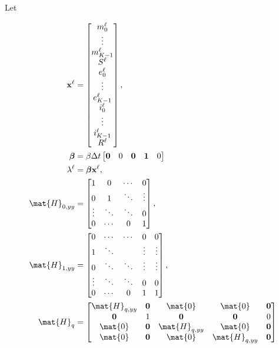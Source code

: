 \documentclass{jpmarticle}
\renewcommand{\vec}[1]{\boldsymbol{\mathrm{#1}}}
\let\subequationsorig\subequations%
\let\endsubequationsorig\endsubequations%
\renewenvironment{subequations}{
  \subequationsorig
  \renewcommand{\theequation}{\theparentequation.\arabic{equation}}
}{
  \endsubequationsorig
}
\begin{document}
Let
\begin{subequations}
  \begin{align}
    \vec{x}^{\ell} &=
    \begin{bmatrix}
      m_0^{\ell} \\ \vdots \\ m_{K - 1}^{\ell} \\
      S^{\ell} \\
      e_0^{\ell} \\ \vdots \\ e_{K - 1}^{\ell} \\
      i_0^{\ell} \\ \vdots \\ i_{K - 1}^{\ell} \\
      R^{\ell}
    \end{bmatrix},
    \\
    \vec{\beta} &=
    \beta \Delta t
    \begin{bmatrix}
      \vec{0} & 0 & \vec{0} & \vec{1} & 0
    \end{bmatrix}
    \\
    \lambda^{\ell} &=
    \vec{\beta} \vec{x}^{\ell},
    \\
    \mat{H}_{0, yy} &=
    \begin{bmatrix}
      1 & 0 & \cdots & 0 \\
      0 & 1 & \ddots & \vdots \\
      \vdots & \ddots & \ddots & 0 \\
      0 & \cdots & 0 & 1
    \end{bmatrix},
    \\
    \mat{H}_{1, yy} &=
    \begin{bmatrix}
      0 & \cdots & \cdots & 0 & 0 \\
      1 & \ddots & & \vdots & \vdots \\
      0 & \ddots & \ddots & \vdots & \vdots \\
      \vdots & \ddots & \ddots & 0 & 0 \\
      0 & \cdots & 0 & 1 & 1
    \end{bmatrix},
    \\
    \mat{H}_{q} &=
    \begin{bmatrix}
      \mat{H}_{q, yy} & \vec{0} & \mat{0} & \mat{0} & \vec{0} \\
      \vec{0} & 1 & \vec{0} & \vec{0} & 0 \\
      \mat{0} & \vec{0} & \mat{H}_{q, yy} & \mat{0} & \vec{0} \\
      \mat{0} & \vec{0} & \mat{0} & \mat{H}_{q, yy} & \vec{0}

\end{bmatrix}
\end{align}
\end{subequations}
\end{document}

